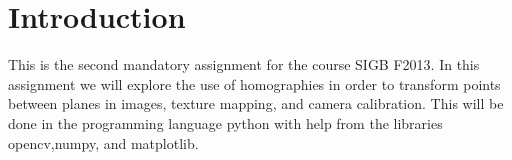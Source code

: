 \section{Introduction}

This is the second mandatory assignment for the course SIGB F2013. In this
assignment we will explore the use of homographies in order to transform points
between
planes in images, texture mapping, and camera calibration. This will
be done in the programming language python with help from the libraries
opencv,numpy, and matplotlib.
